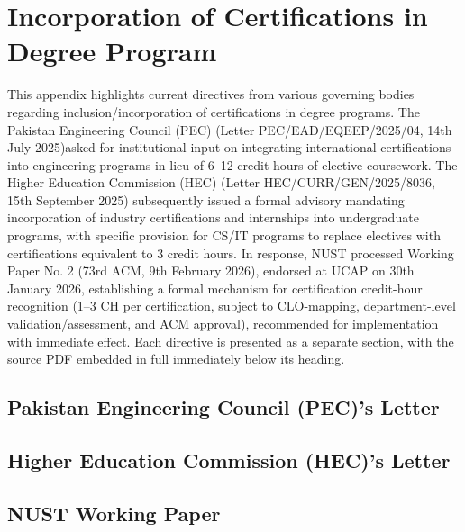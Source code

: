 \chapter{Incorporation of Certifications in Degree Program}\label{app:certifications}

This appendix highlights current directives from various governing bodies regarding inclusion/incorporation of certifications in degree programs. The Pakistan Engineering Council (PEC) (Letter PEC/EAD/EQEEP/2025/04, 14th July 2025)asked for institutional input on integrating international certifications into engineering programs in lieu of 6–12 credit hours of elective coursework. The Higher Education Commission (HEC) (Letter HEC/CURR/GEN/2025/8036, 15th September 2025) subsequently issued a formal advisory mandating incorporation of industry certifications and internships into undergraduate programs, with specific provision for CS/IT programs to replace electives with certifications equivalent to 3 credit hours. In response, NUST processed Working Paper No. 2 (73rd ACM, 9th February 2026), endorsed at UCAP on 30th January 2026, establishing a formal mechanism for certification credit-hour recognition (1–3 CH per certification, subject to CLO-mapping, department-level validation/assessment, and ACM approval), recommended for implementation with immediate effect. Each directive is presented as a separate section, with the source PDF embedded in full immediately below its heading.

\section{Pakistan Engineering Council (PEC)'s Letter }

\section{Higher Education Commission (HEC)'s Letter}

\section{NUST Working Paper}
